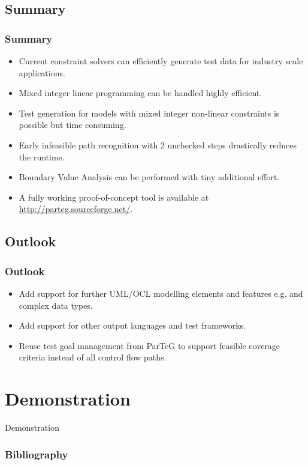 \documentclass{beamer}
\begin{document}
\subsection{Summary}
\begin{frame}
\frametitle{Summary}
\begin{itemize}
  \item Current constraint solvers can efficiently generate test data for industry scale applications.
  \item Mixed integer linear programming can be handled highly efficient.
  \item Test generation for models with mixed integer non-linear constraints is possible but time consuming.
  \item Early infeasible path recognition with 2 unchecked steps drastically reduces the runtime.
  \item Boundary Value Analysis can be performed with tiny additional effort.
  \item A fully working proof-of-concept tool is available at \href{http://parteg.sourceforge.net/}{http://parteg.sourceforge.net/}.
\end{itemize}
\end{frame}

\subsection{Outlook}
\begin{frame}
\frametitle{Outlook}
\begin{itemize}
  \item Add support for further UML/OCL modelling elements and features e.g.  and complex data types.
  \item Add support for other output languages and test frameworks.
  \item Reuse test goal management from ParTeG to support feasible coverage criteria instead of all control flow paths.~\cite{ParTeG}
\end{itemize}
\end{frame}

\section{Demonstration}
\begin{frame}
\begin{block}{}
\begin{center}
\Huge{Demonstration}
\end{center}
\end{block}
\end{frame}



\frametitle{Bibliography}

%

\end{document}
